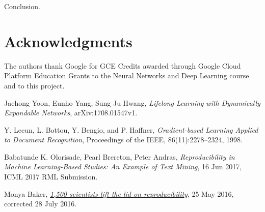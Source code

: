 \documentclass[12pt]{article}
\begin{document}
    Conclusion.

    \section{Acknowledgments}

    The authors thank Google for GCE Credits awarded through Google Cloud Platform Education Grants
    to the Neural Networks and Deep Learning course and to this project.    
        
    \begin{thebibliography}{9}
            Jaehong Yoon, Eunho Yang, Sung Ju Hwang,
            \textit{Lifelong Learning with Dynamically Expandable Networks},
            arXiv:1708.01547v1.

            Y. Lecun, L. Bottou, Y. Bengio, and P. Haffner,
            \textit{Gradient-based Learning Applied to Document Recognition},
            Proceedings of the IEEE, 86(11):2278–2324, 1998.

            Babatunde K. Olorisade, Pearl Brereton, Peter Andras, 
            \textit{Reproducibility in Machine Learning-Based Studies: An Example of Text Mining},
            16 Jun 2017, ICML 2017 RML Submission.

            Monya Baker,
            \href{https://www.nature.com/news/1-500-scientists-lift-the-lid-on-reproducibility-1.19970}{\textit{1,500 scientists lift the lid on reproducibility}},
            25 May 2016, corrected 28 July 2016.

    \end{thebibliography}
    
    
\end{document}
